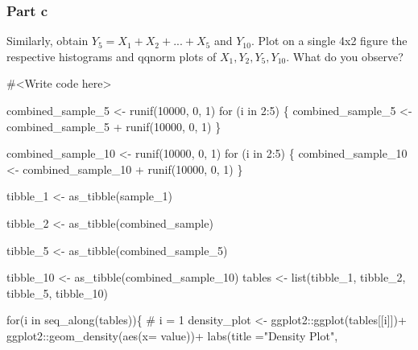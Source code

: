 \documentclass[
  letterpaper,
  DIV=11,
  numbers=noendperiod]{scrartcl}
\newenvironment{Shaded}{\begin{snugshade}}{\end{snugshade}}
\newcommand{\AttributeTok}[1]{\textcolor[rgb]{0.40,0.45,0.13}{#1}}
\newcommand{\CommentTok}[1]{\textcolor[rgb]{0.37,0.37,0.37}{#1}}
\newcommand{\ControlFlowTok}[1]{\textcolor[rgb]{0.00,0.23,0.31}{#1}}
\newcommand{\DecValTok}[1]{\textcolor[rgb]{0.68,0.00,0.00}{#1}}
\newcommand{\FunctionTok}[1]{\textcolor[rgb]{0.28,0.35,0.67}{#1}}
\newcommand{\NormalTok}[1]{\textcolor[rgb]{0.00,0.23,0.31}{#1}}
\newcommand{\OtherTok}[1]{\textcolor[rgb]{0.00,0.23,0.31}{#1}}
\newcommand{\SpecialCharTok}[1]{\textcolor[rgb]{0.37,0.37,0.37}{#1}}
\newcommand{\StringTok}[1]{\textcolor[rgb]{0.13,0.47,0.30}{#1}}
\begin{document}
\hypertarget{part-c-2}{%
\subsubsection{Part c}\label{part-c-2}}

Similarly, obtain \(Y_{5} = X_{1} + X_{2} + ... + X_{5}\) and
\(Y_{10}\). Plot on a single 4x2 figure the respective histograms and
qqnorm plots of \(X_{1}, Y_{2}, Y_{5}, Y_{10}\). What do you observe?

\begin{Shaded}
\begin{Highlighting}[]
\CommentTok{\#\textless{}Write code here\textgreater{}}


\NormalTok{combined\_sample\_5 }\OtherTok{\textless{}{-}} \FunctionTok{runif}\NormalTok{(}\DecValTok{10000}\NormalTok{, }\DecValTok{0}\NormalTok{, }\DecValTok{1}\NormalTok{)}
\ControlFlowTok{for}\NormalTok{ (i }\ControlFlowTok{in} \DecValTok{2}\SpecialCharTok{:}\DecValTok{5}\NormalTok{) \{}
\NormalTok{  combined\_sample\_5 }\OtherTok{\textless{}{-}}\NormalTok{ combined\_sample\_5 }\SpecialCharTok{+} \FunctionTok{runif}\NormalTok{(}\DecValTok{10000}\NormalTok{, }\DecValTok{0}\NormalTok{, }\DecValTok{1}\NormalTok{)}
\NormalTok{\}}

\NormalTok{combined\_sample\_10 }\OtherTok{\textless{}{-}} \FunctionTok{runif}\NormalTok{(}\DecValTok{10000}\NormalTok{, }\DecValTok{0}\NormalTok{, }\DecValTok{1}\NormalTok{)}
\ControlFlowTok{for}\NormalTok{ (i }\ControlFlowTok{in} \DecValTok{2}\SpecialCharTok{:}\DecValTok{5}\NormalTok{) \{}
\NormalTok{  combined\_sample\_10 }\OtherTok{\textless{}{-}}\NormalTok{ combined\_sample\_10 }\SpecialCharTok{+} \FunctionTok{runif}\NormalTok{(}\DecValTok{10000}\NormalTok{, }\DecValTok{0}\NormalTok{, }\DecValTok{1}\NormalTok{)}
\NormalTok{\}}

\NormalTok{tibble\_1 }\OtherTok{\textless{}{-}} \FunctionTok{as\_tibble}\NormalTok{(sample\_1)}

\NormalTok{tibble\_2 }\OtherTok{\textless{}{-}} \FunctionTok{as\_tibble}\NormalTok{(combined\_sample)}

\NormalTok{tibble\_5 }\OtherTok{\textless{}{-}} \FunctionTok{as\_tibble}\NormalTok{(combined\_sample\_5)}

\NormalTok{tibble\_10 }\OtherTok{\textless{}{-}} \FunctionTok{as\_tibble}\NormalTok{(combined\_sample\_10)}
\NormalTok{tables }\OtherTok{\textless{}{-}} \FunctionTok{list}\NormalTok{(tibble\_1, tibble\_2, tibble\_5, tibble\_10)}

\ControlFlowTok{for}\NormalTok{(i }\ControlFlowTok{in} \FunctionTok{seq\_along}\NormalTok{(tables))\{}
 \CommentTok{\# i = 1}
\NormalTok{  density\_plot }\OtherTok{\textless{}{-}}\NormalTok{  ggplot2}\SpecialCharTok{::}\FunctionTok{ggplot}\NormalTok{(tables[[i]])}\SpecialCharTok{+}
\NormalTok{  ggplot2}\SpecialCharTok{::}\FunctionTok{geom\_density}\NormalTok{(}\FunctionTok{aes}\NormalTok{(}\AttributeTok{x=}\NormalTok{ value))}\SpecialCharTok{+}
  \FunctionTok{labs}\NormalTok{(}\AttributeTok{title =}\StringTok{"Density Plot"}\NormalTok{, }
   

\end{Highlighting}
\end{Shaded}
\end{document}
